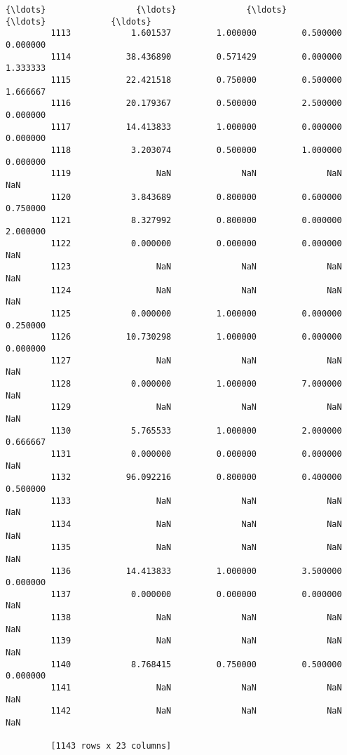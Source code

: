 \documentclass[11pt]{article}
\begin{document}
\begin{Verbatim}[commandchars=\\\{\}]
         {\ldots}                  {\ldots}              {\ldots}              {\ldots}             {\ldots}  
         1113            1.601537         1.000000         0.500000        0.000000  
         1114           38.436890         0.571429         0.000000        1.333333  
         1115           22.421518         0.750000         0.500000        1.666667  
         1116           20.179367         0.500000         2.500000        0.000000  
         1117           14.413833         1.000000         0.000000        0.000000  
         1118            3.203074         0.500000         1.000000        0.000000  
         1119                 NaN              NaN              NaN             NaN  
         1120            3.843689         0.800000         0.600000        0.750000  
         1121            8.327992         0.800000         0.000000        2.000000  
         1122            0.000000         0.000000         0.000000             NaN  
         1123                 NaN              NaN              NaN             NaN  
         1124                 NaN              NaN              NaN             NaN  
         1125            0.000000         1.000000         0.000000        0.250000  
         1126           10.730298         1.000000         0.000000        0.000000  
         1127                 NaN              NaN              NaN             NaN  
         1128            0.000000         1.000000         7.000000             NaN  
         1129                 NaN              NaN              NaN             NaN  
         1130            5.765533         1.000000         2.000000        0.666667  
         1131            0.000000         0.000000         0.000000             NaN  
         1132           96.092216         0.800000         0.400000        0.500000  
         1133                 NaN              NaN              NaN             NaN  
         1134                 NaN              NaN              NaN             NaN  
         1135                 NaN              NaN              NaN             NaN  
         1136           14.413833         1.000000         3.500000        0.000000  
         1137            0.000000         0.000000         0.000000             NaN  
         1138                 NaN              NaN              NaN             NaN  
         1139                 NaN              NaN              NaN             NaN  
         1140            8.768415         0.750000         0.500000        0.000000  
         1141                 NaN              NaN              NaN             NaN  
         1142                 NaN              NaN              NaN             NaN  
         
         [1143 rows x 23 columns]
\end{Verbatim}
            
\end{document}
